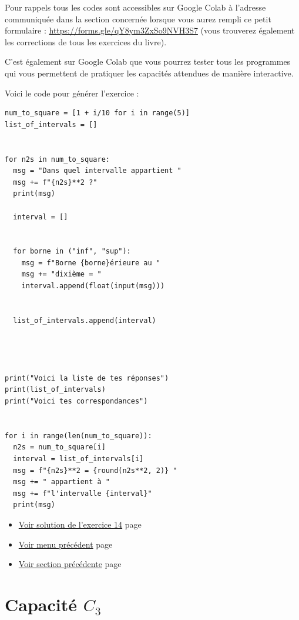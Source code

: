 \documentclass[a4paper,11pt]{book}
\begin{document}
Pour rappels tous les codes sont accessibles sur Google Colab à
l'adresse communiquée dans la section concernée lorsque vous
aurez rempli ce petit formulaire : \url{https://forms.gle/qY8ym3ZxSo9NVH3S7}
(vous trouverez également les corrections de tous les exercices du
livre).

C'est également sur Google Colab que vous pourrez tester tous les
programmes qui vous permettent de pratiquer les capacités attendues
de manière interactive.

\clearpage

Voici le code pour générer l'exercice :

\begin{verbatim}
num_to_square = [1 + i/10 for i in range(5)]
list_of_intervals = []


for n2s in num_to_square:
  msg = "Dans quel intervalle appartient "
  msg += f"{n2s}**2 ?"
  print(msg)

  interval = []


  for borne in ("inf", "sup"):
    msg = f"Borne {borne}érieure au "
    msg += "dixième = "
    interval.append(float(input(msg)))


  list_of_intervals.append(interval)




print("Voici la liste de tes réponses")
print(list_of_intervals)
print("Voici tes correspondances")


for i in range(len(num_to_square)):
  n2s = num_to_square[i]
  interval = list_of_intervals[i]
  msg = f"{n2s}**2 = {round(n2s**2, 2)} "
  msg += " appartient à "
  msg += f"l'intervalle {interval}"
  print(msg)
\end{verbatim}


\newpage

\begin{itemize}
\item \hyperref[orgfeec3ba]{Voir solution de l'exercice 14}
page~\pageref{page:sec9.2.1sol14}
\item \hyperref[org449ea02]{Voir menu précédent}
page~\pageref{page:capacity2-menu}
\item \hyperref[org873e05f]{Voir section précédente}
page~\pageref{page:sec3.3.1x-axis}
\end{itemize}


\clearpage

\chapter{Capacité \(C_3\)}
\label{sec:orga9c5ab5}
\label{org376c46d}
\label{page:sec3.4capacity3}
\end{document}
